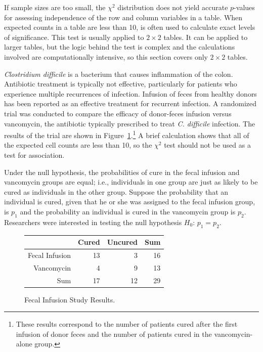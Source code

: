 If sample sizes are too small, the $\chi^2$ distribution does not yield accurate $p$-values for  assessing  independence of the row and column variables in a table.  When expected counts in a table are less than 10,  is often  used to calculate exact levels of significance. This test is usually applied to $2 \times 2$ tables. It can be applied to larger tables, but the logic behind the test is complex and the calculations involved are computationally intensive,  so this section covers only $2 \times 2$ tables.


\textit{Clostridium difficile} is a bacterium that causes inflammation of the colon. Antibiotic treatment is typically not effective, particularly for patients who experience multiple recurrences of infection. Infusion of feces from healthy donors has been reported as an effective treatment for recurrent infection. A randomized trial was conducted to compare the efficacy of donor-feces infusion versus vancomycin, the antibiotic typically prescribed to treat \textit{C. difficile }infection. The results of the trial are shown in Figure~\ref{fecalStudyResultsTest}.\footnote{These results correspond to the number of patients cured after the first infusion of donor feces and the number of patients cured in the vancomycin-alone group.} A brief calculation shows that all of the expected cell counts are less than 10, so the $\chi^2$ test should not be used as a test for association.

Under the null hypothesis, the probabilities of cure in the fecal infusion and vancomycin groups are equal; i.e., individuals in one group are just as likely to be cured as individuals in the other group. Suppose the probability that an individual is cured, given that he or she was assigned to the fecal infusion group, is $p_1$ and the probability an individual is cured in the vancomycin group is $p_2$. Researchers were interested in testing the null hypothesis $H_0$: $p_1 = p_2$.


\begin{figure}[h]
	\centering
	\begin{tabular}{rrrr}
		\hline
		& Cured & Uncured & Sum \\
		\hline
		Fecal Infusion & 13 & 3 & 16 \\
		Vancomycin & 4 & 9 & 13 \\
		Sum & 17 & 12 & 29 \\
		\hline
	\end{tabular}
	\caption{Fecal Infusion Study Results.}
	\label{fecalStudyResultsTest}
\end{figure}

